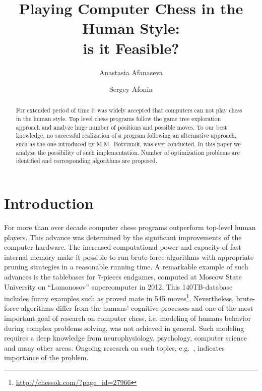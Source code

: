 \documentclass{llncs}
\author{Anastasia Afanaseva \and Sergey Afonin}
\institute{Moscow State University, Russian Federation\\
}%
\title{Playing Computer Chess in the Human Style:\\ is it Feasible?}
\begin{document}
\maketitle

\begin{abstract}
  For extended period of time it was widely accepted that
  computers can not play chess in the human style. Top level chess
  programs follow the game tree exploration approach and analyze
  huge number of positions and possible moves. To our best
  knowledge, no successful realization of a program following an
  alternative approach, such as the one introduced by M.M.~Botvinnik,
  was ever conducted.
  In this paper we analyze the possibility of such implementation. Number
  of optimization problems are identified and corresponding algorithms
  are proposed.

\end{abstract}

\section{Introduction}
For more than over decade computer chess programs outperform top-level
human players. This advance was determined by the significant
improvements of the computer hardware. The increased computational power and
capacity of fast internal memory make it possible to run brute-force
algorithms with appropriate pruning strategies in a reasonable running
time. A remarkable example of such advances is the tablebases for 7-pieces endgames, computed at Moscow State
University on ``Lomonosov'' supercomputer in 2012. This 140TB-database includes funny
examples such as proved mate in 545 moves\footnote{\url{http://chessok.com/?page_id=27966}}. Nevertheless, brute-force
algorithms differ from the humans' cognitive processes and one of the
most important goal of research on computer chess, i.e. modeling of
humans behavior during complex problems solving, was not achieved in
general. Such modeling requires a deep knowledge from neurophysiology,
psychology, computer science and many other areas. Ongoing research
on such topics, e.g.~\cite{reingold:2005:perception,CAMPITELLI2007}, indicates
importance of the problem.
\end{document}
